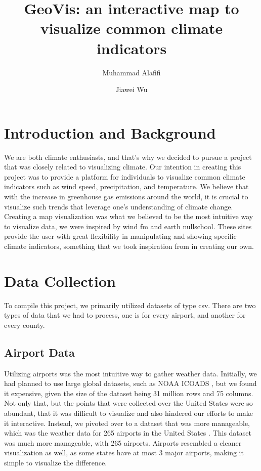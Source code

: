 \documentclass[10pt,twocolumn,twoside]{opticajnl}
\title{GeoVis: an interactive map to visualize common climate indicators}
\author[1,2]{Muhammad Alafifi}
\author[1,3]{Jiawei Wu}
\affil[1]{Computer Science Department, Rensselaer Polytechnic Institute, 1999 Burdett Ave, Troy NY, 12180}
\affil[2]{email: alafim@rpi.edu}
\affil[3]{email: wuj22@rpi.edu}
\begin{document}
\maketitle

\section{Introduction and Background}

We are both climate enthusiasts, and that's why we decided to pursue a project that was closely related to visualizing climate. Our intention in creating this project was to provide a platform for individuals to visualize common climate indicators such as wind speed, precipitation, and temperature. We believe that with the increase in greenhouse gas emissions around the world, it is crucial to visualize such trends that leverage one's understanding of climate change. Creating a map visualization was what we believed to be the most intuitive way to visualize data, we were inspired by wind fm \cite{a2019_wind} and \cite{beccario_2019_earth} earth nullschool. These sites provide the user with great flexibility in manipulating and showing specific climate indicators, something that we took inspiration from in creating our own.

\section{Data Collection}

To compile this project, we primarily utilized datasets of type csv. There are two types of data that we had to process, one is for every airport, and another for every county.

\subsection{Airport Data}

Utilizing airports was the most intuitive way to gather weather data. Initially, we had planned to use large global datasets, such as NOAA ICOADS \cite{noaa_2017_noaa}, but we found it expensive, given the size of the dataset being 31 million rows and 75 columns. Not only that, but the points that were collected over the United States were so abundant, that it was difficult to visualize and also hindered our efforts to make it interactive. Instead, we pivoted over to a dataset that was more manageable, which was the weather data for 265 airports in the United States \cite{nanduri_2021_weather}. This dataset was much more manageable, with 265 airports. Airports resembled a cleaner visualization as well, as some states have at most 3 major airports, making it simple to visualize the difference.
\end{document}
